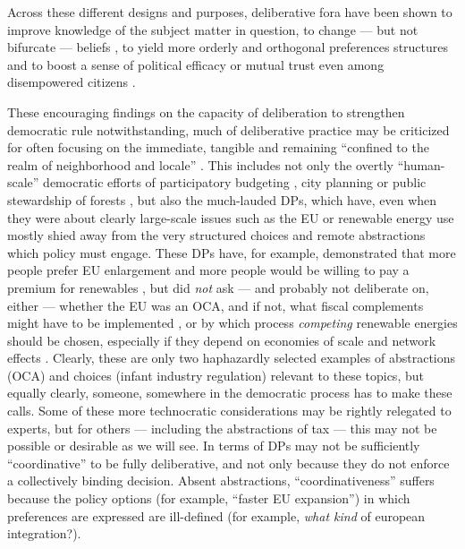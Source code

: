 
Across these different designs and purposes, deliberative fora have been shown to improve knowledge of the subject matter in question, to change --- but not bifurcate --- beliefs \citep{Fishkin2009}, to yield more orderly and orthogonal preferences structures \citep{Farrar2003} and to boost a sense of political efficacy or mutual trust even among disempowered citizens \citep{Karpowitz2009}.

These encouraging findings on the capacity of deliberation to strengthen democratic rule notwithstanding, much of deliberative practice may be criticized for often focusing on the immediate, tangible and remaining ``confined to the realm of neighborhood and locale'' \citep[17]{FungWright-2001-aa}. 
This includes not only the overtly ``human-scale'' democratic efforts \citep[759]{Boggs-1997-aa} of participatory budgeting \citep{Sousa-Santos-1998-aa}, city planning \citep{Sokoloff2005} or public stewardship of forests \citep{Cheng2005}, but also the much-lauded \glspl{DP}, which have, even when they were about clearly large-scale issues such as the \gls{EU} \citep{Fishkin2009} or renewable energy use \citep{LehrGuild-2003-aa} mostly shied away from the very structured choices and remote abstractions which policy must engage. 
These \glspl{DP} have, for example, demonstrated that more people prefer \gls{EU} enlargement and more people would be willing to pay a premium for renewables \citep[K2013]{Fishkin2009}, but did \emph{not} ask --- and probably not deliberate on, either --- whether the \gls{EU} was an \gls{OCA}, and if not, what fiscal complements might have to be implemented \citep{Mundell1961}, or by which process \emph{competing} renewable energies should be chosen, especially if they depend on economies of scale and network effects \citep[for example, ][]{Krugman-1990-aa}.
Clearly, these are only two haphazardly selected examples of abstractions (\gls{OCA}) and choices (infant industry regulation) relevant to these topics, but equally clearly, someone, somewhere in the democratic process has to make these calls.
Some of these more technocratic considerations may be rightly relegated to experts, but for others --- including the abstractions of tax --- this may not be possible or desirable as we will see.
In terms of \citealt[377]{Landwehr2010} \glspl{DP} may not be sufficiently ``coordinative'' to be fully deliberative, and not only because they do not enforce a collectively binding decision.
Absent abstractions, ``coordinativeness'' suffers because the policy options (for example, ``faster \gls{EU} expansion'') in which preferences are expressed \citep[375]{Landwehr2010} are ill-defined (for example, \emph{what kind} of european integration?).
